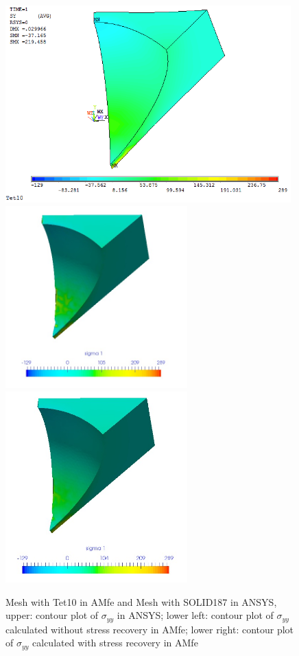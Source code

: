 \begin{figure}[htbp]
	\begin{center}
		\includegraphics[width=11cm,clip]{Tet10_Syy.png} 	
		\includegraphics[width=7cm,clip]{Tet10_Syy_PD.png} 			
		\includegraphics[width=7cm,clip]{Tet10_Syy_P.png} 		
		\caption{Mesh with Tet10 in AMfe and Mesh with SOLID187 in ANSYS, upper: contour plot of $\sigma_{yy}$ in ANSYS; lower left: contour plot of $\sigma_{yy}$ calculated without stress recovery in AMfe; lower right: contour plot of $\sigma_{yy}$ calculated with stress recovery in AMfe} \label{fig: Tet10_Syy}
	\end{center}
\end{figure}
\clearpage 

